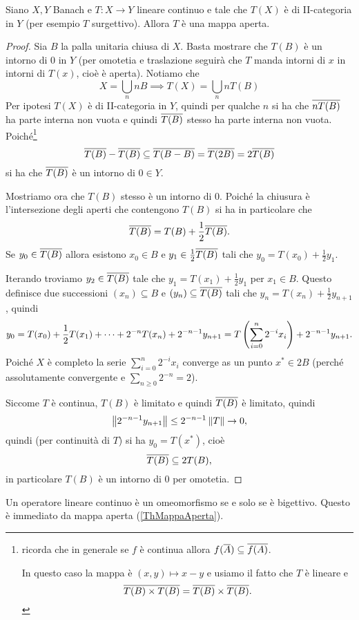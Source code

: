 \begin{theorem}\label{ThMappaAperta}
Siano $X,Y$ Banach e $T:X\to Y$ lineare continuo e tale che $T(X)$ \`e di II-categoria in $Y$ (per esempio $T$ surgettivo). Allora $T$ \`e una mappa aperta.
\end{theorem}
\begin{proof}
Sia $B$ la palla unitaria chiusa di $X$. Basta mostrare che $T(B)$ \`e un intorno di $0$ in $Y$ (per omotetia e traslazione seguir\`a che $T$ manda intorni di $x$ in intorni di $T(x)$, cio\`e \`e aperta). Notiamo che 
\[X=\bigcup_n nB\implies T(X)=\bigcup_n nT(B)\]
Per ipotesi $T(X)$ \`e di II-categoria in $Y$, quindi per qualche $n$ si ha che $\overline{n T(B)}$ ha parte interna non vuota e quindi $\overline{T(B)}$ stesso ha parte interna non vuota. Poich\'e\footnote{ricorda che in generale se $f$ \`e continua allora $f(\overline{A})\subseteq \overline{f(A)}$. 

In questo caso la mappa \`e $(x,y)\mapsto x-y$ e usiamo il fatto che $T$ \`e lineare e \[\overline{T(B)\times T(B)}=\overline{T(B)}\times \overline{T(B)}.\]} 
\[\overline{T(B)}-\overline{T(B)}\subseteq \overline{T(B-B)}=\overline{T(2B)}=2\overline{T(B)}\]
si ha che $\overline{T(B)}$ \`e un intorno di $0\in Y$.


Mostriamo ora che $T(B)$ stesso \`e un intorno di $0$. Poich\'e la chiusura \`e l'intersezione degli aperti che contengono $T(B)$ si ha in particolare che
\[\overline{T(B)}=T(B)+\frac12\overline{T(B)}.\]
Se $y_0\in\overline{T(B)}$ allora esistono $x_0\in B$ e $y_1\in \frac12\overline{T(B)}$ tali che $y_0=T(x_0)+\frac12 y_1$.

Iterando troviamo $y_2\in \overline{T(B)}$ tale che $y_1=T(x_1)+\frac12 y_1$ per $x_1\in B$. Questo definisce due successioni $(x_n)\subseteq B$ e $(y_n)\subseteq \overline{T(B)}$ tali che $y_n=T(x_n)+\frac12 y_{n+1}$, quindi
\[y_0=T(x_0)+\frac12 T(x_1)+\cdots+2^{-n}T(x_n)+2^{-n-1}y_{n+1}=T\left({\sum_{i=0}^n2^{-i}x_i}\right)+2^{-n-1}y_{n+1}.\]
Poich\'e $X$ \`e completo la serie $\sum_{i=0}^n2^{-i}x_i$ converge as un punto $x^\ast\in 2B$ (perch\'e assolutamente convergente e $\sum_{n\geq 0} 2^{-n}=2$). 

Siccome $T$ \`e continua, $T(B)$ \`e limitato e quindi $\overline{T(B)}$ \`e limitato, quindi 
\[\left\Vert{2^{-n-1}y_{n+1}}\right\Vert\leq 2^{-n-1}\left\Vert{T}\right\Vert\to 0,\]
quindi (per continuit\`a di $T$) si ha $y_0=T(x^\ast)$, cio\`e
\[\overline{T(B)}\subseteq 2T(B),\]
in particolare $T(B)$ \`e un intorno di $0$ per omotetia.
\end{proof}

\begin{remark}
Un operatore lineare continuo \`e un omeomorfismo se e solo se \`e bigettivo. Questo \`e immediato da mappa aperta (\ref{ThMappaAperta}).
\end{remark}

